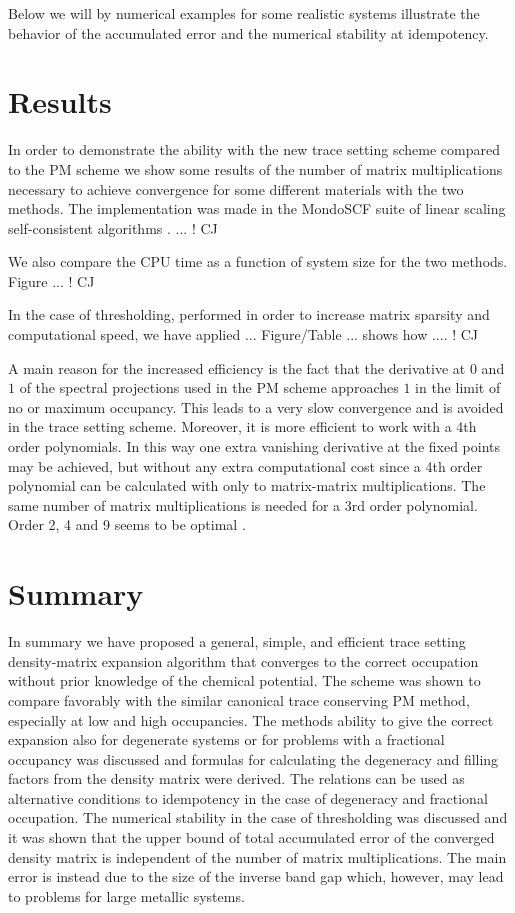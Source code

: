 Below we will by numerical examples for some realistic systems illustrate
the behavior of the accumulated error and the numerical stability at idempotency.


\section{Results}

In order to demonstrate the ability with the new trace setting scheme 
compared to the PM scheme we show some results of the number of matrix
multiplications necessary to achieve convergence for some different 
materials with the two methods. The implementation was made in
the MondoSCF suite of linear scaling self-consistent algorithms
\cite{Mondo}. ... ! CJ

We also compare the CPU time as a function of system size for
the two methods. Figure ... ! CJ

In the case of thresholding, performed in order to increase
matrix sparsity and computational speed, we have applied ...
Figure/Table ... shows how .... ! CJ

A main reason for the increased efficiency is the fact that
the derivative at $0$ and $1$ of the spectral projections used
in the PM scheme approaches $1$ in the limit of no or maximum
occupancy. This leads to a very slow convergence and is avoided
in the trace setting scheme. Moreover, it is more efficient to 
work with a 4th order polynomials. In this way one extra vanishing
derivative at the fixed points may be achieved, but without any
extra computational cost since a 4th order polynomial can be
calculated with only to matrix-matrix multiplications. The
same number of matrix multiplications is needed for a 3rd
order polynomial. Order 2, 4 and 9 seems to be optimal \cite{Niklasson02}.


\section{Summary}

In summary we have proposed a general, simple, and efficient 
trace setting density-matrix expansion algorithm that converges 
to the correct occupation without prior knowledge of the chemical
potential. The scheme was shown to compare favorably with the
similar canonical trace conserving PM method, especially at
low and high occupancies. The methods ability to give the
correct expansion also for degenerate systems or for problems
with a fractional occupancy was discussed
and formulas for calculating the degeneracy and filling factors
from the density matrix were derived. The relations can
be used as alternative conditions to idempotency in the
case of degeneracy and fractional occupation.
The numerical stability in the case of thresholding
was discussed and it was shown that the upper bound of 
total accumulated error of the converged density matrix is independent
of the number of matrix multiplications. The main error 
is instead due to the size of the inverse band gap which, however,
may lead to problems for large metallic systems.


